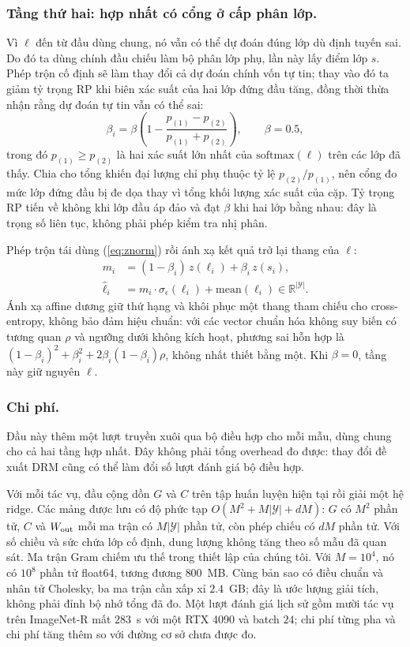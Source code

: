 \documentclass[runningheads]{llncs}
\begin{document}
\subsubsection{Tầng thứ hai: hợp nhất có cổng ở cấp phân lớp.}
Vì $\ell$ đến từ đầu dùng chung, nó vẫn có thể dự đoán đúng lớp dù định tuyến
sai. Do đó ta dùng chính đầu chiếu làm bộ phân lớp phụ, lần này lấy điểm lớp
$s$. Phép trộn cố định sẽ làm thay đổi cả dự đoán chính vốn tự tin; thay vào đó
ta giảm tỷ trọng RP khi biên xác suất của hai lớp đứng đầu tăng, đồng thời thừa
nhận rằng dự đoán tự tin vẫn có thể sai:
\begin{equation}
\beta_i = \beta \left( 1 - \frac{p_{(1)} - p_{(2)}}{p_{(1)} + p_{(2)}} \right),
\qquad \beta = 0.5 ,
\label{eq:gate}
\end{equation}
trong đó $p_{(1)}\geq p_{(2)}$ là hai xác suất lớn nhất của
$\mathrm{softmax}(\ell)$ trên các lớp đã thấy. Chia cho tổng khiến đại lượng chỉ
phụ thuộc tỷ lệ $p_{(2)}/p_{(1)}$, nên cổng đo mức lớp đứng đầu bị đe dọa thay
vì tổng khối lượng xác suất của cặp. Tỷ trọng RP tiến về không khi lớp đầu áp
đảo và đạt $\beta$ khi hai lớp bằng nhau: đây là trọng số liên tục, không phải
phép kiểm tra nhị phân.

Phép trộn tái dùng (\ref{eq:znorm}) rồi ánh xạ kết quả trở lại thang của $\ell$:
\begin{align}
m_i &= (1 - \beta_i)\, z(\ell_i) + \beta_i\, z(s_i),
\label{eq:mix}\\
\hat{\ell}_i &= m_i \cdot \sigma_\epsilon(\ell_i) + \mathrm{mean}(\ell_i)
   \in \mathbb{R}^{|\mathcal{Y}|}.
\label{eq:affine}
\end{align}
Ánh xạ affine dương giữ thứ hạng và khôi phục một thang tham chiếu cho
cross-entropy, không bảo đảm hiệu chuẩn: với các vector chuẩn hóa không suy
biến có tương quan $\rho$ và ngưỡng dưới không kích hoạt, phương sai hỗn hợp là
$(1-\beta_i)^2+\beta_i^2+2\beta_i(1-\beta_i)\rho$, không nhất thiết bằng một.
Khi $\beta=0$, tầng này giữ nguyên $\ell$.

\subsubsection{Chi phí.}
Đầu này thêm một lượt truyền xuôi qua bộ điều hợp cho mỗi mẫu, dùng chung cho
cả hai tầng hợp nhất. Đây không phải tổng overhead đo được: thay đổi đề xuất
DRM cũng có thể làm đổi số lượt đánh giá bộ điều hợp.

Với mỗi tác vụ, đầu cộng dồn $G$ và $C$ trên tập huấn luyện hiện tại rồi giải
một hệ ridge. Các mảng được lưu có độ phức tạp
$O(M^2+M|\mathcal Y|+dM)$: $G$ có $M^2$ phần tử, $C$ và $W_{\rm out}$ mỗi
ma trận có $M|\mathcal Y|$ phần tử, còn phép chiếu có $dM$ phần tử. Với số
chiều và sức chứa lớp cố định, dung lượng không tăng theo số mẫu đã quan sát.
Ma trận Gram chiếm ưu thế trong thiết lập của chúng tôi. Với $M=10^4$, nó có
$10^8$ phần tử float64, tương đương $800$~MB. Cùng bản sao có điều chuẩn và
nhân tử Cholesky, ba ma trận cần xấp xỉ $2.4$~GB; đây là ước lượng giải tích,
không phải đỉnh bộ nhớ tổng đã đo. Một lượt đánh giá lịch sử gồm mười tác vụ
trên ImageNet-R mất $283$~s với một RTX 4090 và batch $24$; chi phí từng pha
và chi phí tăng thêm so với đường cơ sở chưa được đo.
\end{document}
